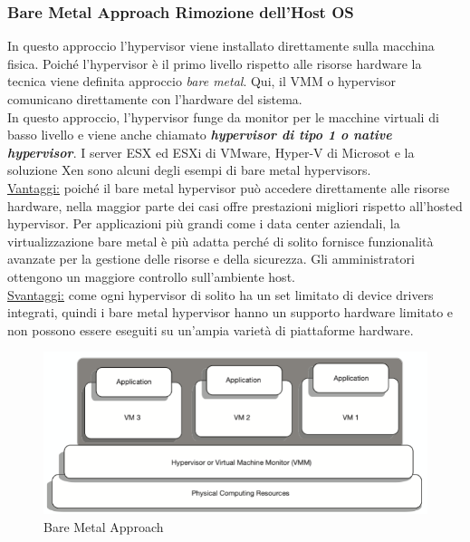 \documentclass{article}
\begin{document}
\subsubsection{Bare Metal Approach Rimozione dell'Host OS}
In questo approccio l'hypervisor viene installato direttamente sulla macchina fisica. Poiché l'hypervisor è il primo livello rispetto alle risorse hardware la tecnica viene definita approccio \textit{bare metal}. Qui, il VMM o hypervisor comunicano direttamente con l'hardware del sistema. \\
In questo approccio, l'hypervisor funge da monitor per le macchine virtuali di basso livello e viene anche chiamato \textit{\textbf{hypervisor di tipo 1 o native hypervisor}}. I server ESX ed ESXi di VMware, Hyper-V di Microsot e la soluzione Xen sono alcuni degli esempi di bare metal hypervisors. \\ 
\uline{Vantaggi:} poiché il bare metal hypervisor può accedere direttamente alle risorse hardware, nella maggior parte dei casi offre prestazioni migliori rispetto all'hosted hypervisor. Per applicazioni più grandi come i data center aziendali, la virtualizzazione bare metal è più adatta perché di solito fornisce funzionalità avanzate per la gestione delle risorse e della sicurezza. Gli amministratori ottengono un maggiore controllo sull'ambiente host. \\
\uline{Svantaggi:} come ogni hypervisor di solito ha un set limitato di device drivers integrati, quindi i bare metal hypervisor hanno un supporto hardware limitato e non possono essere eseguiti su un'ampia varietà di piattaforme hardware.
\begin{figure}[H]
    \centering
    \includegraphics[scale=0.8]{img/bare metal.png}
    \caption{Bare Metal Approach}
\end{figure}\noindent
\end{document}

